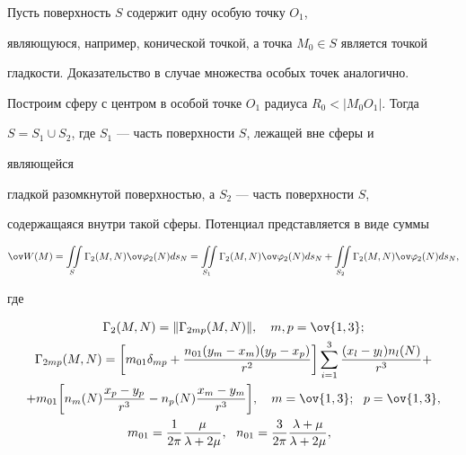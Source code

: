  


\begin{pf} 


Пусть поверхность $S$ содержит одну особую точку $O_1$,  


являющуюся, например, конической точкой, а точка $M_0\in S$ является точкой  


гладкости. Доказательство в случае множества особых точек аналогично.  


Построим сферу с центром в особой точке $O_1$ радиуса $R_0<|M_0O_1|$. Тогда  


$S=S_1\cup S_2$, где $S_1$ --- часть поверхности $S$, лежащей вне сферы и 


являющейся  


гладкой разомкнутой поверхностью, а $S_2$ --- часть поверхности $S$, 


содержащаяся внутри такой сферы. Потенциал представляется в виде суммы 


\begin{equation} 


\ov W(M)=\iint\limits_S \Gamma_2(M,N)\ov\varphi_2(N)ds_N= 


\iint\limits_{S_1}\Gamma_2(M,N)\ov\varphi_2(N)ds_N+ 


\iint\limits_{S_2}\Gamma_2(M,N)\ov\varphi_2(N)ds_N, 


\end{equation} 


где 


\begin{gather*} 


\Gamma_2(M,N)=\|\Gamma_{2mp}(M,N)\|,\quad m,p=\ov{1,3};\\ 


% 


\Gamma_{2mp}(M,N)=\bigg[m_{01}\delta_{mp}+ 


\frac{n_{01}(y_m-x_m)(y_p-x_p)}{r^2}\bigg] 


\sum^3_{i=1}\frac{(x_l-y_l)n_l(N)}{r^3}+ \\ 


% 


+m_{01}\bigg[n_m(N)\frac{x_p-y_p}{r^3}-n_p(N) 


\frac{x_m-y_m}{r^3}\bigg],\quad m=\ov{1,3};\ \ p=\ov{1,3},\\ 


% 


m_{01}=\frac{1}{2\pi}\frac{\mu}{\lambda+2\mu},\ \  


n_{01}=\frac{3}{2\pi}\frac{\lambda+\mu}{\lambda+2\mu},\ \  



\end{gather*}
\end{pf}
